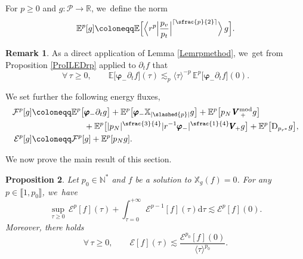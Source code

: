 \documentclass[JEP,XML,SOM,Unicode,published]{cedram}
\theoremstyle{plain}
\newtheorem{proposition}{Proposition}[section]
\theoremstyle{definition}
\newtheorem{remark}[proposition]{Remark}
\newcommand\R{{\mathbb{R}}}
\newcommand\T{{\mathbb{X}}}
\newcommand\dr{{\mathrm{d}}}
\begin{document}
For $p \geq 0$ and $g \colon \mathcal{P} \to \R$, we~define the norm
\[
\mathbb{E}^p[g] \coloneqq \mathbb{E} \Bigl[ \Big\langle r^{p} \Big| \frac{p_v}{p_t} \Big|^{\lceil \sfrac{p}{2} \rceil} \Big\rangle \, g \Bigr].
\]

\begin{remark}
As a direct application of Lemma \ref{Lemrpmethod}, we~get from Proposition \ref{ProILEDrp} applied to $\partial_t f$ that
\[
\forall \, \tau \geq 0, \qquad \mathbb{E} \bigl[ \pmb{\varphi}_- \partial_t f \bigr] (\tau) \lesssim_p \langle \tau \rangle^{-p} \, \mathbb{E}^p \bigl[ \pmb{\varphi}_- \partial_t f \bigr](0).
\]
\end{remark}

We set further the following energy fluxes,
\begin{align*}
\mathcal{F}^p[g] & \coloneqq \mathbb{E}^p \bigl[ \pmb{\varphi}_- \partial_t g \bigr] +\mathbb{E}^p \bigl[ \pmb{\varphi}_- \T_{|\slashed{p}|} g \bigr] + \mathbb{E}^p \bigl[ p_N \, \pmb{V}_{\,+}^{\mathrm{mod}} g \bigr] \\
& \hspace*{2.2cm}+\mathbb{E}^p \bigl[ |p_N|^{\sfrac{3}{4}} | r^{-1} \pmb{\varphi}_-|^{\sfrac{1}{4}} \pmb{V}_{\! +} g \bigr] +\mathbb{E}^p \bigl[ \mathrm{D}_{p_{r^*}} g \bigr], \\
\mathcal{E}^p [g] & \coloneqq \mathcal{F}^p[g]+\mathbb{E}^p[p_Ng].
\end{align*}

We now prove the main result of this section.

\begin{proposition}\label{Propdecayrp}
Let $p_0 \in \mathbb{N}^*$ and $f$ be a solution to $\T_g(f)=0$. For any $p \in \llbracket 1,p_0 \rrbracket$, we~have\vspace*{-3pt}
\begin{equation}\label{equation:daou}
\sup_{\tau \geq 0} \, \mathcal{E}^p[f](\tau) + \int_{\tau=0}^{+\infty} \mathcal{E}^{p-1}[f](\tau) \dr \tau \lesssim \mathcal{E}^p[f](0).
\end{equation}
Moreover, there holds\vspace*{-3pt}
\begin{equation}\label{prop_decay_flux}
\forall \, \tau \geq 0, \qquad \mathcal{E}[f](\tau) \lesssim \frac{\mathcal{E}^{p_0}[f](0)}{\langle \tau \rangle^{p_0}}.
\end{equation}
\end{proposition}
\end{document}

